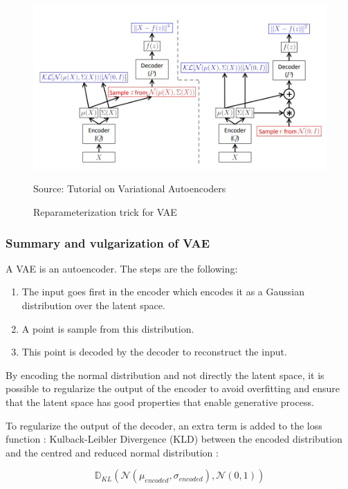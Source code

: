 \documentclass[12pt]{report}
\begin{document}
\begin{figure}[htbp]
    \centering
    \includegraphics[width=\textwidth]{images/nn/architectures/reparameterization-trick.jpg}
    \caption{Reparameterization trick for VAE}
    Source: Tutorial on Variational Autoencoders \cite{doersch_tutorial_2016}
    \label{fig:vae:reparameterization-trick}
\end{figure}

\subsubsection{Summary and vulgarization of VAE}

A VAE  is an autoencoder. The steps are the following:
\begin{enumerate}
    \item The input goes first in the encoder which encodes it as a Gaussian distribution over the latent space.
    \item A point is sample from this distribution.
    \item This point is decoded by the decoder to reconstruct the input.
\end{enumerate}

By encoding the normal distribution and not directly the latent space, it is possible to regularize the output of the encoder to avoid overfitting and ensure that the latent space has good properties that enable generative process.

To regularize the output of the decoder, an extra term is added to the loss function : Kulback-Leibler Divergence (KLD) between the encoded distribution and the centred and reduced normal distribution :

\begin{equation}
    \mathbb{D}_{KL} (\mathcal{N}(\mu_{encoded}, \sigma_{encoded}), \mathcal{N}(0, 1))
\end{equation}
\end{document}
